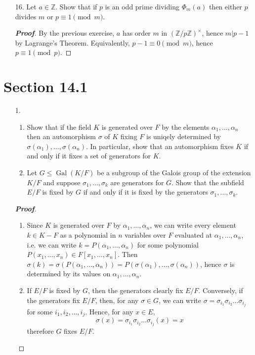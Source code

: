 \documentclass[12pt,leqno]{article}
\theoremstyle{definition}
\newcommand{\Gal}{\operatorname{Gal}}
\newcommand{\Z}{\mathbb{Z}}
\newenvironment{Proof}{\begin{proof}[\textnormal{\textbf{Proof}}]}{\end{proof}}
\begin{document}
\begin{enumerate}
\begin{Proof}
    \end{Proof}
   \item [16.] Let $a\in\Z$. Show that if $p$ is an odd prime dividing $\varPhi_m(a)$ then either $p$ divides $m$ or $p\equiv1\pmod{m}$.
    \begin{Proof}
     By the previous exercise, $a$ has order $m$ in $(\Z/p\Z)^{\times}$, hence $m|p-1$ by Lagrange's Theorem. Equivalently, $p-1\equiv0\pmod{m}$, hence $p\equiv1\pmod{p}$.
    \end{Proof}
  \end{enumerate}


\section*{Section 14.1}
\begin{enumerate}
   \item [1.] 
    \begin{enumerate}
     \item Show that if the field $K$ is generated over $F$ by the elements $\alpha_1,\hdots,\alpha_n$ then an automorphism $\sigma$ of $K$ fixing $F$ is uniqely determined by $\sigma(\alpha_1),\hdots,\sigma(\alpha_n)$. In particular, show that an automorphism fixes $K$ if and only if it fixes a set of generators for $K$.
     \item Let $G\leq\Gal(K/F)$ be a subgroup of the Galois group of the extension $K/F$ and suppose $\sigma_1,\hdots,\sigma_k$ are generators for $G$. Show that the subfield $E/F$ is fixed by $G$ if and only if it is fixed by the generators $\sigma_1,\hdots,\sigma_k$.
    \end{enumerate}
    \begin{Proof}\indent
     \begin{enumerate}
      \item Since $K$ is generated over $F$ by $\alpha_1,\hdots,\alpha_n$, we can write every element $k\in K-F$ as a polynomial in $n$ variables over $F$ evaluated at $\alpha_1,\hdots,\alpha_n$, i.e. we can write $k=P(\alpha_1,\hdots,\alpha_n)$ for some polynomial $P(x_1,\hdots,x_n)\in F[x_1,\hdots,x_n]$. Then $\sigma(k)=\sigma(P(\alpha_1,\hdots,\alpha_n))=P(\sigma(\alpha_1),\hdots,\sigma(\alpha_n))$, hence $\sigma$ is determined by its values on $\alpha_1,\hdots,\alpha_n$.
      \item If $E/F$ is fixed by $G$, then the generators clearly fix $E/F$. Conversely, if the generators fix $E/F$, then, for any $\sigma\in G$, we can write $\sigma=\sigma_{i_1}\sigma_{i_2}\hdots\sigma_{i_j}$ for some $i_1,i_2,\hdots, i_j$. Hence, for any $x\in E$, \[\sigma(x)=\sigma_{i_1}\sigma_{i_2}\hdots\sigma_{i_j}(x)=x\] therefore $G$ fixes $E/F$.\qedhere

\end{enumerate}
\end{Proof}
\end{enumerate}
\end{document}
